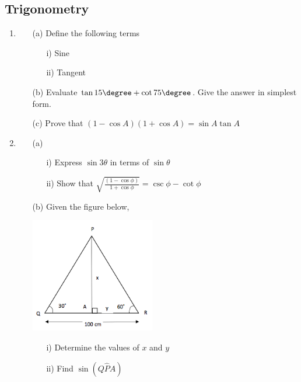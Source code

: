 \subsection{Trigonometry}

\begin{enumerate}
	\item
	\begin{enumerate}[topsep=0ex,itemsep=0ex,partopsep=1ex,parsep=1ex]
		\item[(a)] Define the following terms
		\begin{enumerate}[topsep=0ex,itemsep=0ex,partopsep=1ex,parsep=1ex]
			\item[i)] Sine
			\item[ii)] Tangent
		\end{enumerate}
		
		\item[(b)] Evaluate $\tan15 \degree + \cot75 \degree$. Give the answer in simplest form.
		
		\item[(c)] Prove that $(1 - \cos{A})(1 + \cos{A}) = \sin{A}\tan{A}$
	\end{enumerate}

	\item
	\begin{enumerate}[topsep=0ex,itemsep=0ex,partopsep=1ex,parsep=1ex]
		\item[(a)] 
		\begin{enumerate}[topsep=0ex,itemsep=0ex,partopsep=1ex,parsep=1ex]
			\item[i)] Express $\sin3\theta$ in terms of $\sin\theta$
			\item[ii)] Show that $\sqrt{\frac{(1 - \cos{\phi})}{1 + \cos{\phi}}} = \csc{\phi} - \cot{\phi}$
		\end{enumerate}
		
		\item[(b)] Given the figure below,
		\vspace*{-7mm}
		\begin{center}
			\includegraphics[width=0.45\textwidth]{./img/math_BAM_trig_1.png}
		\end{center}
		\begin{enumerate}[topsep=0ex,itemsep=0ex,partopsep=1ex,parsep=1ex]
			\item[i)] Determine the values of $x$ and $y$
			\item[ii)] Find $\sin(Q\hat{P}A)$
		\end{enumerate}
	\end{enumerate}
	

\end{enumerate}
